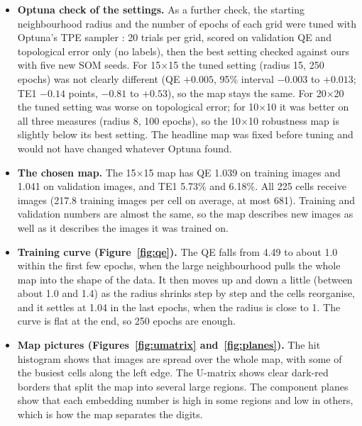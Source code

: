 \documentclass[11pt]{article}
\begin{document}
\begin{itemize}[leftmargin=1.4em, itemsep=2pt]
\item \textbf{Optuna check of the settings.} As a further check, the starting neighbourhood radius and the number of epochs of each grid were tuned with Optuna's TPE sampler \cite{akiba2019optuna}: 20 trials per grid, scored on validation QE and topological error only (no labels), then the best setting checked against ours with five new SOM seeds. For 15$\times$15 the tuned setting (radius 15, 250 epochs) was not clearly different (QE $+0.005$, 95\% interval $-0.003$ to $+0.013$; TE1 $-0.14$ points, $-0.81$ to $+0.53$), so the map stays the same. For 20$\times$20 the tuned setting was worse on topological error; for 10$\times$10 it was better on all three measures (radius 8, 100 epochs), so the 10$\times$10 robustness map is slightly below its best setting. The headline map was fixed before tuning and would not have changed whatever Optuna found.

\item \textbf{The chosen map.} The 15$\times$15 map has QE 1.039 on training images and 1.041 on validation images, and TE1 5.73\% and 6.18\%. All 225 cells receive images (217.8 training images per cell on average, at most 681). Training and validation numbers are almost the same, so the map describes new images as well as it describes the images it was trained on.

\item \textbf{Training curve (Figure~\ref{fig:qe}).} The QE falls from 4.49 to about 1.0 within the first few epochs, when the large neighbourhood pulls the whole map into the shape of the data. It then moves up and down a little (between about 1.0 and 1.4) as the radius shrinks step by step and the cells reorganise, and it settles at 1.04 in the last epochs, when the radius is close to 1. The curve is flat at the end, so 250 epochs are enough.

\item \textbf{Map pictures (Figures~\ref{fig:umatrix} and~\ref{fig:planes}).} The hit histogram shows that images are spread over the whole map, with some of the busiest cells along the left edge. The U-matrix shows clear dark-red borders that split the map into several large regions. The component planes show that each embedding number is high in some regions and low in others, which is how the map separates the digits.
\end{itemize}
\end{document}
